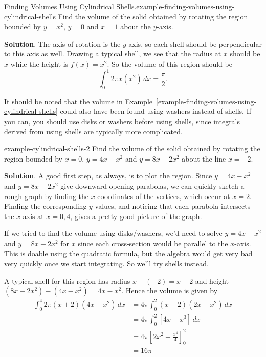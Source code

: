 \documentclass[10pt,]{book}
\numberwithin{equation}{section}
\newcommand{\amp}{&}
\begin{document}
\begin{example}{Finding Volumes Using Cylindrical Shells.}{example-finding-volumes-using-cylindrical-shells}%
\hypertarget{p-642}{}%
Find the volume of the solid obtained by rotating the region bounded by \(y = x^{2}\), \(y = 0\) and \(x = 1\) about the \(y\)-axis.%
\par\smallskip%
\noindent\textbf{Solution}.\hypertarget{solution-140}{}\quad%
\hypertarget{p-643}{}%
The axis of rotation is the \(y\)-axis, so each shell should be perpendicular to this axis as well. Drawing a typical shell, we see that the radius at \(x\) should be \(x\) while the height is \(f(x) = x^{2}\). So the volume of this region should be%
\begin{equation*}
\int_{0}^{1}2\pi x(x^{2})\,dx = \frac{\pi}{2}.
\end{equation*}
%
\end{example}
\hypertarget{p-644}{}%
It should be noted that the volume in \hyperref[example-finding-volumes-using-cylindrical-shells]{Example~\ref{example-finding-volumes-using-cylindrical-shells}} could also have been found using washers instead of shells. If you can, you should use disks or washers before using shells, since integrals derived from using shells are typically more complicated.%
\begin{example}{}{example-cylindrical-shells-2}%
\hypertarget{p-645}{}%
Find the volume of the solid obtained by rotating the region bounded by \(x = 0\), \(y = 4x - x^{2}\) and \(y = 8x - 2x^{2}\) about the line \(x = -2\).%
\par\smallskip%
\noindent\textbf{Solution}.\hypertarget{solution-141}{}\quad%
\hypertarget{p-646}{}%
A good first step, as always, is to plot the region. Since \(y = 4x - x^{2}\) and \(y = 8x - 2x^{2}\) give downward opening parabolas, we can quickly sketch a rough graph by finding the \(x\)-coordinates of the vertices, which occur at \(x = 2\). Finding the corresponding \(y\) values, and noticing that each parabola intersects the \(x\)-axis at \(x = 0, 4\), gives a pretty good picture of the graph.%
\par
\hypertarget{p-647}{}%
If we tried to find the volume using disks/washers, we'd need to solve \(y = 4x - x^{2}\) and \(y = 8x - 2x^{2}\) for \(x\) since each cross-section would be parallel to the \(x\)-axis. This is doable using the quadratic formula, but the algebra would get very bad very quickly once we start integrating. So we'll try shells instead.%
\par
\hypertarget{p-648}{}%
A typical shell for this region has radius \(x - (-2) = x + 2\) and height \((8x - 2x^{2}) - (4x - x^{2}) = 4x - x^{2}\). Hence the volume is given by%
\begin{align*}
\int_{0}^{4}2\pi(x + 2)(4x - x^{2})\,dx \amp= 4\pi\int_{0}^{2}(x + 2)(2x - x^{2})\,dx\\
\amp= 4\pi\int_{0}^{2}\left[4x - x^{3}\right]\,dx\\
\amp= 4\pi\left[2x^{2} - \frac{x^{4}}{4}\right]_{0}^{2}\\
\amp= 16\pi
\end{align*}
%
\end{example}
%
%
\typeout{************************************************}
\typeout{************************************************}
%
\end{document}

